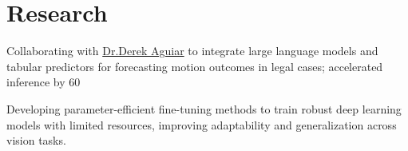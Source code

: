 \documentclass[]{resume-template}
\begin{document}
\begin{minipage}[t]{0.66\textwidth}


  \section{Research}\label{sec:research}
  
  \begin{tightemize}
  \item Collaborating with
    \href{https://www.derekaguiar.com/}{Dr.Derek Aguiar} to integrate large language models and tabular predictors for forecasting motion outcomes in legal cases; accelerated inference by 60%

   \item Developing parameter-efficient fine-tuning methods to train robust deep learning models with limited resources, improving adaptability and generalization across vision tasks. 
   
  \end{tightemize}



\end{minipage}
\end{document}
